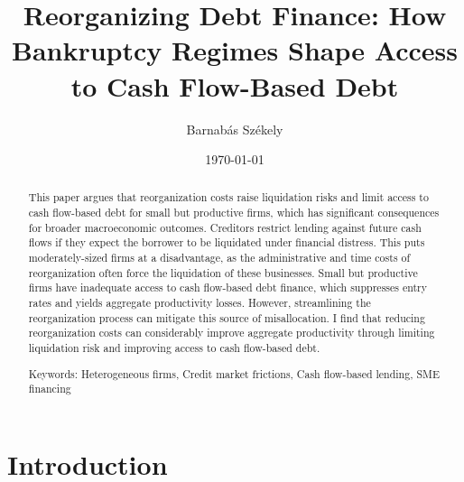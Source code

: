 \documentclass[12pt]{article}
\title{Reorganizing Debt Finance: How Bankruptcy Regimes Shape Access to Cash Flow-Based Debt}
\date{}
\begin{document}
\author{Barnabás Székely}
\date{\today}
\vspace{-1in}

\maketitle

\begin{abstract}
\noindent

This paper argues that reorganization costs raise liquidation risks and limit access to cash flow-based debt for small but productive firms, which has significant consequences for broader macroeconomic outcomes. Creditors restrict lending against future cash flows if they expect the borrower to be liquidated under financial distress. This puts moderately-sized firms at a disadvantage, as the administrative and time costs of reorganization often force the liquidation of these businesses. Small but productive firms have inadequate access to cash flow-based debt finance, which suppresses entry rates and yields aggregate productivity losses. However, streamlining the reorganization process can mitigate this source of misallocation. I find that reducing reorganization costs can considerably improve aggregate productivity through limiting liquidation risk and improving access to cash flow-based debt. 

\bigskip{}
\bigskip{}

Keywords: Heterogeneous firms, Credit market frictions, Cash flow-based lending, SME financing
\medskip{}
\end{abstract}
\thispagestyle{empty}

\pagebreak{}


\section{Introduction \label{sec:introduction}} 
\end{document}

